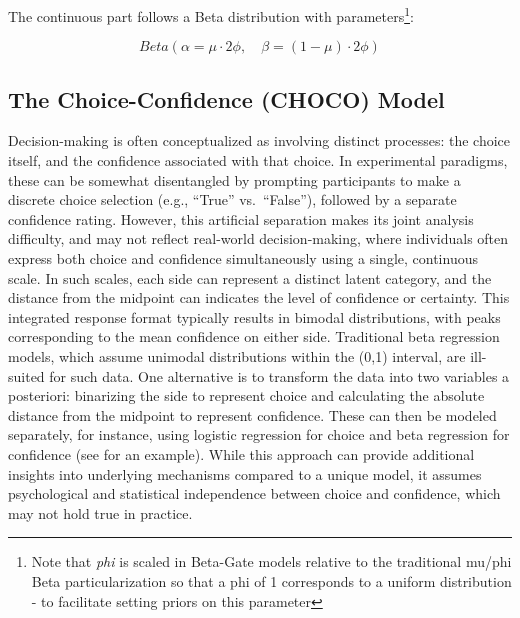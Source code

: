 \documentclass[
  jou,
  floatsintext,
  longtable,
  nolmodern,
  notxfonts,
  notimes,
  colorlinks=true,linkcolor=blue,citecolor=blue,urlcolor=blue]{apa7}
\begin{document}
The continuous part follows a Beta distribution with
parameters\footnote{Note that \emph{phi} is scaled in Beta-Gate models
  relative to the traditional mu/phi Beta particularization so that a
  phi of 1 corresponds to a uniform distribution - to facilitate setting
  priors on this parameter}:

\[
Beta(\alpha = \mu \cdot 2 \phi, \quad \beta = (1 - \mu) \cdot 2 \phi)
\]

\subsection{The Choice-Confidence (CHOCO)
Model}\label{the-choice-confidence-choco-model}

Decision-making is often conceptualized as involving distinct processes:
the choice itself, and the confidence associated with that choice. In
experimental paradigms, these can be somewhat disentangled by prompting
participants to make a discrete choice selection (e.g., ``True''
vs.~``False''), followed by a separate confidence rating. However, this
artificial separation makes its joint analysis difficulty, and may not
reflect real-world decision-making, where individuals often express both
choice and confidence simultaneously using a single, continuous scale.
In such scales, each side can represent a distinct latent category, and
the distance from the midpoint can indicates the level of confidence or
certainty. This integrated response format typically results in bimodal
distributions, with peaks corresponding to the mean confidence on either
side. Traditional beta regression models, which assume unimodal
distributions within the (0,1) interval, are ill-suited for such data.
One alternative is to transform the data into two variables a
posteriori: binarizing the side to represent choice and calculating the
absolute distance from the midpoint to represent confidence. These can
then be modeled separately, for instance, using logistic regression for
choice and beta regression for confidence (see
 for an example).
While this approach can provide additional insights into underlying
mechanisms compared to a unique model, it assumes psychological and
statistical independence between choice and confidence, which may not
hold true in practice.
\end{document}
